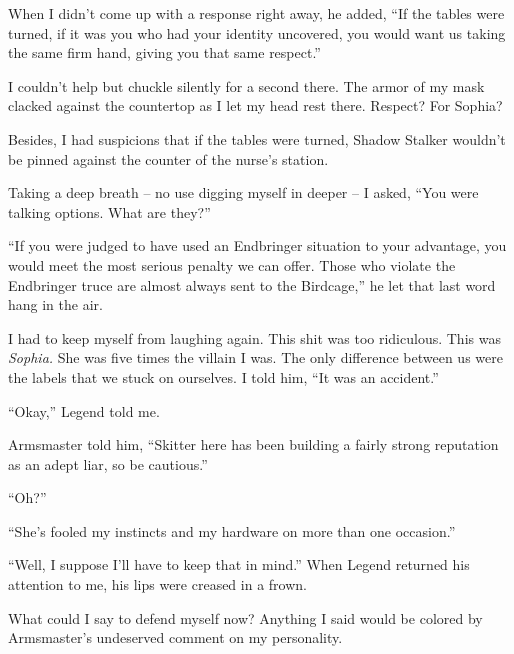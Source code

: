 When I didn't come up with a response right away, he added, ``If the tables were turned, if it was you who had your identity uncovered, you would want us taking the same firm hand, giving you that same respect.''



I couldn't help but chuckle silently for a second there.  The armor of my mask clacked against the countertop as I let my head rest there.  Respect?  For Sophia?



Besides, I had suspicions that if the tables were turned, Shadow Stalker wouldn't be pinned against the counter of the nurse's station.



Taking a deep breath – no use digging myself in deeper – I asked, ``You were talking options.  What are they?''



``If you were judged to have used an Endbringer situation to your advantage, you would meet the most serious penalty we can offer.  Those who violate the Endbringer truce are almost always sent to the Birdcage,'' he let that last word hang in the air.



I had to keep myself from laughing again.  This shit was too ridiculous.  This was \emph{Sophia.  }She was five times the villain I was.  The only difference between us were the labels that we stuck on ourselves.  I told him, ``It was an accident.''



``Okay,'' Legend told me.



Armsmaster told him, ``Skitter here has been building a fairly strong reputation as an adept liar, so be cautious.''



``Oh?''



``She's fooled my instincts and my hardware on more than one occasion.''



``Well, I suppose I'll have to keep that in mind.''  When Legend returned his attention to me, his lips were creased in a frown.



What could I say to defend myself now?  Anything I said would be colored by Armsmaster's undeserved comment on my personality.



